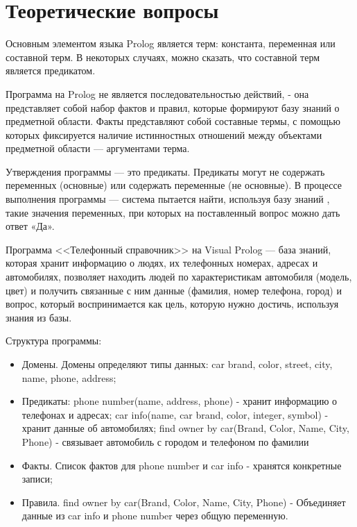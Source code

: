 \chapter*{Теоретические вопросы}
Основным элементом языка Prolog является терм: константа, переменная или составной терм.
В некоторых случаях, можно сказать, что составной терм является предикатом.

Программа на Prolog не является последовательностью действий, - она представляет
собой набор фактов и правил, которые формируют базу знаний о предметной области.
Факты представляют собой составные термы, с помощью которых фиксируется наличие
истинностных отношений между объектами предметной области — аргументами терма.

Утверждения программы — это предикаты. Предикаты могут не содержать переменных
(основные) или содержать переменные (не основные). В процессе выполнения программы —
система пытается найти, используя базу знаний , такие значения переменных, при которых на
поставленный вопрос можно дать ответ «Да».

Программа <<Телефонный справочник>> на Visual Prolog --- база знаний, которая хранит информацию о людях,
их телефонных номерах, адресах и автомобилях, позволяет находить людей по характеристикам автомобиля (модель, цвет) и
получить связанные с ним данные (фамилия, номер телефона, город) и вопрос, который воспринимается как цель, которую
нужно достичь, используя знания из базы.

Структура программы:
\begin{itemize}
    \item Домены. Домены определяют типы данных: car brand, color, street, city, name, phone, address;
    \item Предикаты: phone number(name, address, phone) - хранит информацию о телефонах и адресах; car info(name, car brand, color, integer, symbol) - хранит данные об автомобилях;
    find owner by car(Brand, Color, Name, City, Phone) - связывает автомобиль с городом и телефоном по фамилии
    \item Факты. Список фактов для phone number и car info - хранятся конкретные записи;
    \item Правила. find owner by car(Brand, Color, Name, City, Phone) - Объединяет данные из car info и phone number через общую переменную.
\end{itemize}
